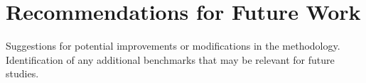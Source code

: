 \section{Recommendations for Future Work}\label{sec:recommendations_for_future_work}
Suggestions for potential improvements or modifications in the methodology.
Identification of any additional benchmarks that may be relevant for future studies.
